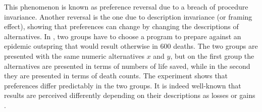 \documentclass[french, english]{llncs}
\newcommand{\dollars}[1]{\SI{#1}[\$]{}}
\newcommand{\simplebet}[3]{(\dollars{#1}, #2; \dollars{#3})}
\begin{document}

This phenomenon is known as preference reversal due to a breach of procedure invariance. Another reversal is the one due to description invariance (or framing effect), showing that preferences can change by changing the descriptions of alternatives. In \citet{tversky_framing_1981}, two groups have to choose a  program to prepare against an epidemic outspring that would result otherwise in 600 deaths. The two groups are presented with the same numeric alternatives $x$ and $y$, but on the first group the alternatives are presented in terms of numbers of life saved, while in the second they are presented in terms of death counts. The experiment shows that preferences differ predictably in the two groups. It is indeed well-known that results are perceived differently depending on their descriptions as losses or gains \citet{thaler_toward_1980}.
\end{document}
